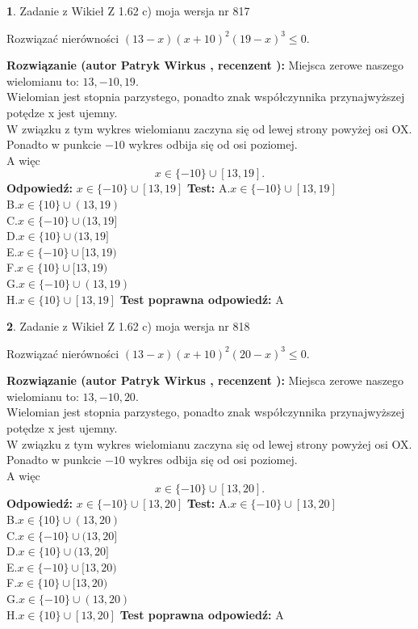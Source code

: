 \documentclass[12pt, a4paper]{article}
\theoremstyle{definition} %
\newtheorem{zad}{}
\newcommand{\zadStart}[1]{\begin{zad}#1\newline}
\newcommand{\zadStop}{\end{zad}}
\newcommand{\rozwStart}[2]{\noindent \textbf{Rozwiązanie (autor #1 , recenzent #2): }\newline}
\newcommand{\rozwStop}{\newline}
\newcommand{\odpStart}{\noindent \textbf{Odpowiedź:}\newline}
\newcommand{\odpStop}{\newline}
\newcommand{\testStart}{\noindent \textbf{Test:}\newline}
\newcommand{\testStop}{\newline}
\newcommand{\kluczStart}{\noindent \textbf{Test poprawna odpowiedź:}\newline}
\newcommand{\kluczStop}{\newline}
\begin{document}
\zadStart{Zadanie z Wikieł Z 1.62 c) moja wersja nr 817}

Rozwiązać nierówności $(13-x)(x+10)^{2}(19-x)^{3}\le0$.
\zadStop
\rozwStart{Patryk Wirkus}{}
Miejsca zerowe naszego wielomianu to: $13, -10, 19$.\\
Wielomian jest stopnia parzystego, ponadto znak współczynnika przy\linebreak najwyższej potędze x jest ujemny.\\ W związku z tym wykres wielomianu zaczyna się od lewej strony powyżej osi OX.\\
Ponadto w punkcie $-10$ wykres odbija się od osi poziomej.\\
A więc $$x \in \{-10\} \cup [13,19].$$
\rozwStop
\odpStart
$x \in \{-10\} \cup [13,19]$
\odpStop
\testStart
A.$x \in \{-10\} \cup [13,19]$\\
B.$x \in \{10\} \cup (13,19)$\\
C.$x \in \{-10\} \cup (13,19]$\\
D.$x \in \{10\} \cup (13,19]$\\
E.$x \in \{-10\} \cup [13,19)$\\
F.$x \in \{10\} \cup [13,19)$\\
G.$x \in \{-10\} \cup (13,19)$\\
H.$x \in \{10\} \cup [13,19]$
\testStop
\kluczStart
A
\kluczStop



\zadStart{Zadanie z Wikieł Z 1.62 c) moja wersja nr 818}

Rozwiązać nierówności $(13-x)(x+10)^{2}(20-x)^{3}\le0$.
\zadStop
\rozwStart{Patryk Wirkus}{}
Miejsca zerowe naszego wielomianu to: $13, -10, 20$.\\
Wielomian jest stopnia parzystego, ponadto znak współczynnika przy\linebreak najwyższej potędze x jest ujemny.\\ W związku z tym wykres wielomianu zaczyna się od lewej strony powyżej osi OX.\\
Ponadto w punkcie $-10$ wykres odbija się od osi poziomej.\\
A więc $$x \in \{-10\} \cup [13,20].$$
\rozwStop
\odpStart
$x \in \{-10\} \cup [13,20]$
\odpStop
\testStart
A.$x \in \{-10\} \cup [13,20]$\\
B.$x \in \{10\} \cup (13,20)$\\
C.$x \in \{-10\} \cup (13,20]$\\
D.$x \in \{10\} \cup (13,20]$\\
E.$x \in \{-10\} \cup [13,20)$\\
F.$x \in \{10\} \cup [13,20)$\\
G.$x \in \{-10\} \cup (13,20)$\\
H.$x \in \{10\} \cup [13,20]$
\testStop
\kluczStart
A
\kluczStop
\end{document}
